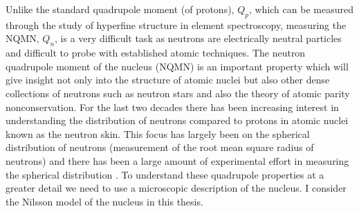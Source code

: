 \documentclass[10pt,a4paper, twoside, openright]{report}
\begin{document}
Unlike the standard quadrupole moment (of protons), $Q_p$, which can be measured through the study of hyperfine structure in element spectroscopy, measuring the NQMN, $Q_{n}$,  is a very difficult  task as neutrons are electrically neutral particles and difficult to probe with established atomic techniques. The neutron quadrupole moment of the nucleus (NQMN) is an important property which will give insight not only into the structure of  atomic nuclei but also other dense collections of neutrons such as neutron stars \cite{Brown2000, Furnstahl2002, Typel2001, Reinhard2010} and also the theory of atomic parity nonconservation. For the last two decades there has been increasing interest in understanding the distribution of neutrons compared to protons in atomic nuclei known as the neutron skin. This focus has largely been on the spherical distribution of neutrons (measurement of the root mean square radius of neutrons) and there has been a large amount of experimental effort in measuring the spherical distribution \cite{Clark2003, Trzcinska2001, Lenske2009, Abrahamyan2012}. To understand these quadrupole properties at a greater detail we need to use a microscopic description of the nucleus. I consider the Nilsson model of the nucleus in this thesis.
\end{document}

